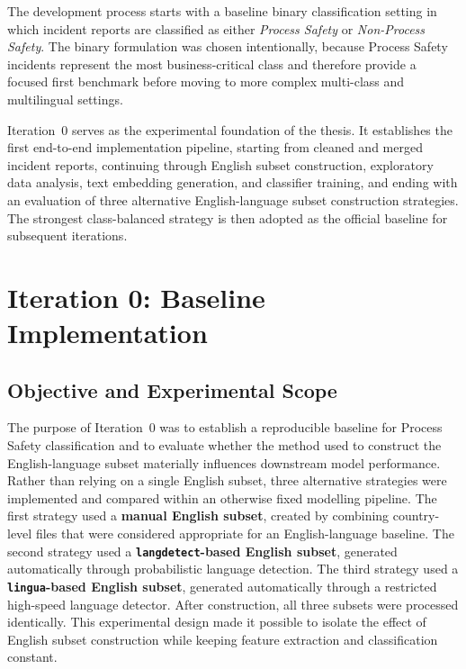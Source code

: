 \documentclass[11pt, titlepage, bibliography=totoc]{scrreprt}
\begin{document}
The development process starts with a baseline binary classification setting in which incident reports are classified as either \textit{Process Safety} or \textit{Non-Process Safety}. The binary formulation was chosen intentionally, because Process Safety incidents represent the most business-critical class and therefore provide a focused first benchmark before moving to more complex multi-class and multilingual settings.

Iteration~0 serves as the experimental foundation of the thesis. It establishes the first end-to-end implementation pipeline, starting from cleaned and merged incident reports, continuing through English subset construction, exploratory data analysis, text embedding generation, and classifier training, and ending with an evaluation of three alternative English-language subset construction strategies. The strongest class-balanced strategy is then adopted as the official baseline for subsequent iterations.

\section{Iteration 0: Baseline Implementation}

\subsection{Objective and Experimental Scope}

The purpose of Iteration~0 was to establish a reproducible baseline for Process Safety classification and to evaluate whether the method used to construct the English-language subset materially influences downstream model performance. Rather than relying on a single English subset, three alternative strategies were implemented and compared within an otherwise fixed modelling pipeline. The first strategy used a \textbf{manual English subset}, created by combining country-level files that were considered appropriate for an English-language baseline. The second strategy used a \textbf{\texttt{langdetect}-based English subset}, generated automatically through probabilistic language detection. The third strategy used a \textbf{\texttt{lingua}-based English subset}, generated automatically through a restricted high-speed language detector. After construction, all three subsets were processed identically. This experimental design made it possible to isolate the effect of English subset construction while keeping feature extraction and classification constant.
\end{document}
